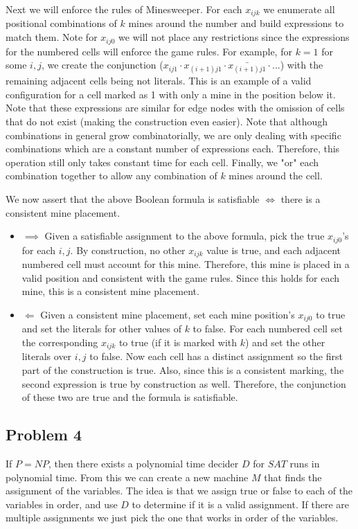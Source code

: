 \documentclass[english]{article}
\begin{document}
Next we will enforce the rules of Minesweeper. For each $x_{ijk}$ we enumerate all positional
combinations of $k$ mines around the number and build expressions to match them. Note for $x_{ij0}$
we will not place any restrictions since the expressions for the numbered cells will enforce the
game rules. For example, for $k = 1$ for some $i,j$, we create the conjunction
($x_{ij1} \cdot x_{(i+1)j1} \cdot \bar{x_{(i+1)j1}} \cdot ...$) with the remaining adjacent cells
being not literals. This is an example of a valid configuration for a cell marked as 1 with only
a mine in the position below it. Note that these expressions are similar for edge nodes with the
omission of cells that do not exist (making the construction even easier). Note that although
combinations in general grow combinatorially, we are only dealing with specific combinations which
are a constant number of expressions each. Therefore, this operation still only takes constant time
for each cell. Finally, we "or" each combination together to allow any combination of $k$ mines
around the cell.

We now assert that the above Boolean formula is satisfiable $\iff$ there is a consistent mine
placement.

\begin{itemize}
	\item $\implies$
	Given a satisfiable assignment to the above formula, pick the true $x_{ij0}$'s for each $i,j$.
	By construction, no other $x_{ijk}$ value is true, and each adjacent numbered cell must account
	for this mine. Therefore, this mine is placed in a valid position and consistent with the game
	rules. Since this holds for each mine, this is a consistent mine placement.
	\item $\Longleftarrow$
	Given a consistent mine placement, set each mine position's $x_{ij0}$ to true and set the literals
	for other values of $k$ to false. For each numbered cell set the corresponding $x_{ijk}$ to true
	(if it is marked with $k$) and set the other literals over $i,j$ to false. Now each cell has
	a distinct assignment so the first part of the construction is true. Also, since this is a
	consistent marking, the second expression is true by construction as well. Therefore, the
	conjunction of these two are true and the formula is satisfiable.
\end{itemize}

\subsection*{Problem 4}
If $P = NP$, then there exists a polynomial time decider $D$ for $SAT$ runs in polynomial time. From this we can
create a new machine $M$ that finds the assignment of the variables. The idea is that we assign true or false to
each of the variables in order, and use $D$ to determine if it is a valid assignment. If there are multiple
assignments we just pick the one that works in order of the variables.
\end{document}
